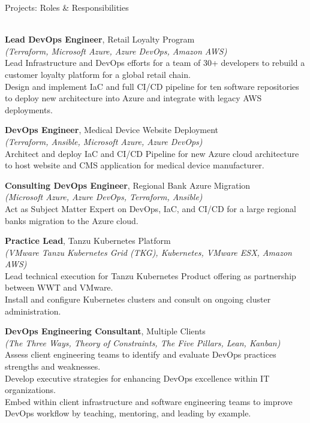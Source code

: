 \documentclass[letterpaper]{article}
\newcommand{\lineunder} {
    \vspace*{-8pt} \\
    \hspace*{-18pt} \hrulefill \\
}
\newcommand{\header} [1] {
    {\hspace*{-18pt}\vspace*{6pt} #1}
    \vspace*{-6pt} \lineunder
}
\begin{document}
\header{Projects: Roles \& Responsibilities} \nopagebreak

{\textbf{Lead DevOps Engineer}, Retail Loyalty Program} \nopagebreak \\
{\sl (Terraform, Microsoft Azure, Azure DevOps, Amazon AWS)} \nopagebreak \\
Lead Infrastructure and DevOps efforts for a team of 30+ developers to rebuild
  a customer loyalty platform for a global retail chain.\nopagebreak \\
Design and implement IaC and full CI/CD pipeline for ten software repositories
  to deploy new architecture into Azure and integrate with legacy AWS
  deployments.\\
\vspace*{2mm}

{\textbf{DevOps Engineer}, Medical Device Website Deployment} \nopagebreak \\
{\sl (Terraform, Ansible, Microsoft Azure, Azure DevOps)} \nopagebreak \\
Architect and deploy IaC and CI/CD Pipeline for new Azure cloud architecture
  to host website and CMS application for medical device manufacturer.\\
\vspace*{2mm}

{\textbf{Consulting DevOps Engineer}, Regional Bank Azure Migration} \nopagebreak \\
{\sl (Microsoft Azure, Azure DevOps, Terraform, Ansible)} \nopagebreak \\
Act as Subject Matter Expert on DevOps, IaC, and CI/CD for a large regional
  bank\textquotesingle{}s migration to the Azure cloud.\\
\vspace*{2mm}

{\textbf{Practice Lead}, Tanzu Kubernetes Platform} \nopagebreak \\
{\sl (VMware Tanzu Kubernetes Grid (TKG), Kubernetes, VMware ESX, Amazon AWS)} \nopagebreak \\
Lead technical execution for Tanzu Kubernetes Product offering as partnership
  between WWT and VMware.\nopagebreak \\
Install and configure Kubernetes clusters and consult on ongoing cluster
  administration.\\
\vspace*{2mm}

{\textbf{DevOps Engineering Consultant}, Multiple Clients} \nopagebreak \\
{\sl (The Three Ways, Theory of Constraints, The Five Pillars, Lean, Kanban)} \nopagebreak \\
Assess client engineering teams to identify and evaluate DevOps practices
  strengths and weaknesses.\\
Develop executive strategies for enhancing DevOps excellence within IT
  organizations.\\
Embed within client infrastructure and software engineering teams to improve
  DevOps workflow by teaching, mentoring, and leading by example.\\
\vspace*{2mm}
\end{document}

